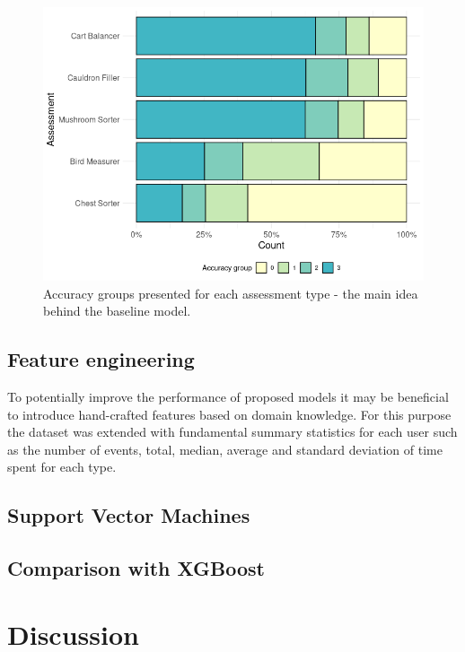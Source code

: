 \documentclass[fleqn,10pt]{SelfArx} %
\begin{document}
\begin{figure}
    \centering
    \includegraphics[width=\linewidth]{images/assessment-accuracy-group-count.png}
    \caption{Accuracy groups presented for each assessment type - the main idea behind the baseline model.}
    \label{fig:assessment-accuracy-by-type}
\end{figure}

\subsection{Feature engineering}

To potentially improve the performance of proposed models it may be beneficial to introduce hand-crafted features based on domain knowledge.
For this purpose the dataset was extended with fundamental summary statistics for each user such as the number of events, total, median, average and standard deviation of time spent for each type.

\subsection{Support Vector Machines}

\subsection{Comparison with XGBoost}


\section{Discussion}
\end{document}
